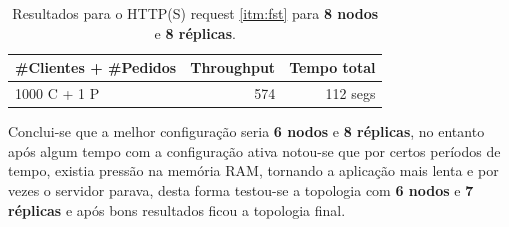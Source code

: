 \begin{table}[H]
    \centering
    \begin{tabular}{|l||r||r|}
    \hline
        \#Clientes + \#Pedidos & Throughput & Tempo total \\ \hline \hline
        1000 C + 1 P & 574 & 112 segs \\ \hline
    \end{tabular}
    \caption{Resultados para o HTTP(S) request \ref{itm:fst} para \textbf{8 nodos} e \textbf{8 réplicas}.}
    \label{tab:testeFront}
\end{table}

Conclui-se que a melhor configuração seria \textbf{6 nodos} e \textbf{8 réplicas}, no entanto após algum tempo com a configuração ativa notou-se que por certos períodos de tempo, existia pressão na memória RAM, tornando a aplicação mais lenta e por vezes o servidor parava, desta forma testou-se a topologia com \textbf{6 nodos} e \textbf{7 réplicas} e após bons resultados ficou a topologia final.
